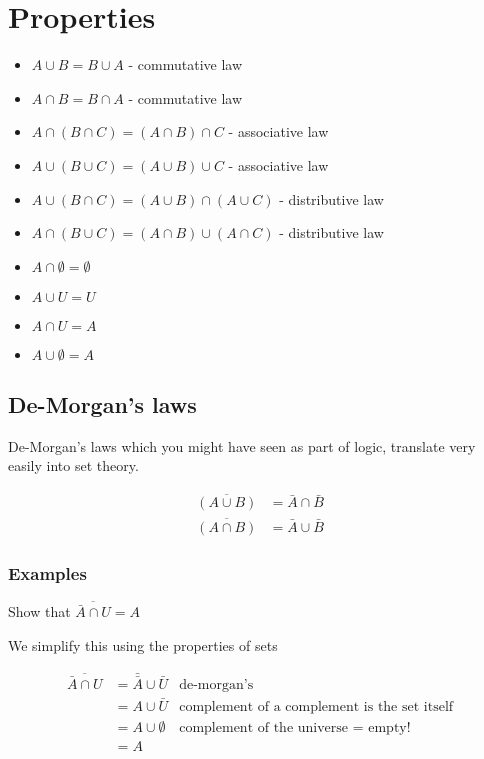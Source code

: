 \documentclass[12pt]{article}
\begin{document}
\section*{Properties}
\begin{itemize}
\item $A \cup B = B \cup A $ - commutative law
\item $A \cap B = B \cap A$ - commutative law
\item $A \cap (B \cap C) = (A \cap B) \cap C$ - associative law
\item $A \cup (B \cup C) = (A \cup B) \cup C$ - associative law
\item $A \cup (B \cap C) = (A \cup B) \cap (A \cup C)$ - distributive law
\item $A \cap (B \cup C) = (A \cap B) \cup (A \cap C)$ - distributive law
\item $A \cap \emptyset = \emptyset$
\item $A \cup U = U$
\item $A \cap U = A$
\item $A \cup \emptyset = A$

\end{itemize}

\subsection*{De-Morgan's laws}
De-Morgan's laws which you might have seen as part of logic, translate very easily into set theory.

\begin{align*}
\overline{(A \cup B)} &= \bar{A} \cap \bar{B} \\
\overline{(A \cap B)} &= \bar{A} \cup \bar{B}
\end{align*}

\subsubsection*{Examples}
Show that $\overline{\bar{A} \cap U} = A$

We simplify this using the properties of sets

\begin{align*}
\overline{\bar{A} \cap U} &= \bar{\bar{A}} \cup \bar{U} & \text{de-morgan's}\\
&= A \cup \bar{U} & \text{complement of a complement is the set itself}\\
&= A \cup \emptyset & \text{complement of the universe = empty!}\\
&= A
\end{align*}
\end{document}

